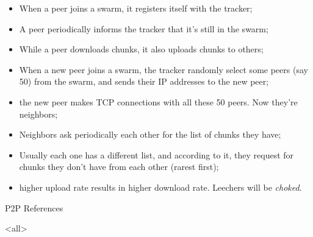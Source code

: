 \begin{itemize}
\item When a peer joins a swarm, it registers itself with the tracker;
\item A peer periodically informs the tracker that it's still in the swarm;
\item While a peer downloads chunks, it also uploads chunks to others;
\item When a new peer joins a swarm, the tracker randomly select some peers (say 50)
  from the swarm, and sends their IP addresses to the new peer;
\item the new peer makes TCP connections with all these 50 peers. Now they're neighbors;
\item Neighbors ask periodically each other for the list of chunks they have;
\item Usually each one has a different list, and according to it, they request for chunks they
  don't have from each other (rarest first);
\item higher upload rate results in higher download rate. Leechers will be \emph{choked}.
\end{itemize}

\begin{frame}{P2P References}
  \begin{refsection}
    \nocite{wiki:bt,cohen08specification}
    \printbibliography[heading=none]
  \end{refsection}
\end{frame}

\mode<all>
